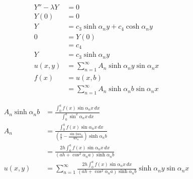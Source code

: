 \documentclass{article}
\begin{document}
\begin{align*}
  Y'' - \lambda Y          & = 0                                                        \\
  Y(0)                     & = 0                                                        \\
  Y                        & = c_3 \sinh \alpha_n y + c_4 \cosh \alpha_n y              \\
  0                        & = Y(0)                                                     \\
                           & = c_4                                                      \\
  Y                        & = c_3 \sinh \alpha_n y                                     \\
  u(x, y)                  & = \sum_{n = 1}^\infty A_n \sinh \alpha_n y \sin \alpha_n x \\
  f(x)                     & = u(x, b)                                                  \\
                           & = \sum_{n = 1}^\infty A_n \sinh \alpha_n b \sin \alpha_n x
\end{align*}

\begin{align*}
  A_n \sinh \alpha_n b & = \frac{\int_0^a f(x) \sin \alpha_n x \,d x}{\int_0^a \sin^2 \alpha_n x \,d x}                                                                    \\
  A_n                  & = \frac{\int_0^a f(x) \sin \alpha_n x \,d x}{\left( \frac{a}{2} - \frac{\sin 2 a \alpha_n}{4 \alpha_n} \right) \sinh \alpha_n b}                  \\
                       & = \frac{2 h \int_0^a f(x) \sin \alpha_n x \,d x}{(a h + \cos^2 \alpha_n a) \sinh \alpha_n b}                                                      \\
  u(x, y)              & = \sum_{n = 1}^\infty \frac{2 h \int_0^a f(x) \sin \alpha_n x \,d x}{(a h + \cos^2 \alpha_n a) \sinh \alpha_n b} \sinh \alpha_n y \sin \alpha_n x
\end{align*}

\setcounter{subsubsection}{4}
\subsubsection{}
\end{document}
